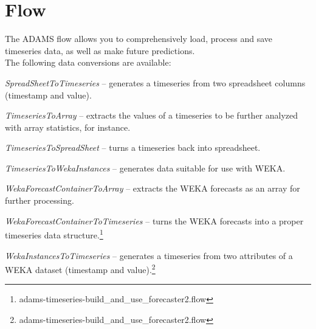 \documentclass[a4paper]{book}
\begin{document}
\chapter{Flow}
The ADAMS flow allows you to comprehensively load, process and save timeseries
data, as well as make future predictions. \\

\noindent The following data conversions are available:
\begin{tight_itemize}
	\item \textit{SpreadSheetToTimeseries} -- generates a timeseries from two
	spreadsheet columns (timestamp and value).
	\item \textit{TimeseriesToArray} -- extracts the values of a timeseries to
	be further analyzed with array statistics, for instance.
	\item \textit{TimeseriesToSpreadSheet} -- turns a timeseries back into
	spreadsheet.
	\item \textit{TimeseriesToWekaInstances} -- generates data suitable for use
	with WEKA.
	\item \textit{WekaForecastContainerToArray} -- extracts the WEKA forecasts
	as an array for further processing.
	\item \textit{WekaForecastContainerToTimeseries} -- turns the WEKA forecasts
	into a proper timeseries data structure.\footnote{adams-timeseries-build\_and\_use\_forecaster2.flow}
	\item \textit{WekaInstancesToTimeseries} -- generates a timeseries from
	two attributes of a WEKA dataset (timestamp and value).\footnote{adams-timeseries-build\_and\_use\_forecaster2.flow}
\end{tight_itemize}
\end{document}
